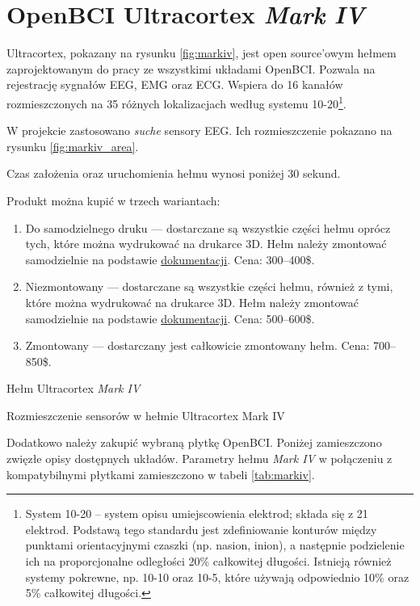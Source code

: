 \documentclass[skorowidz,skroty]{dyplomWEZUT}
\begin{document}
\section{OpenBCI Ultracortex \textit{Mark IV}\label{sec:markiv}}
Ultracortex, pokazany na rysunku \vref{fig:markiv}, jest open source'owym hełmem zaprojektowanym do pracy ze wszystkimi układami OpenBCI\cite{markiv_shop}. Pozwala na rejestrację sygnałów EEG, EMG oraz ECG. Wspiera do 16 kanałów rozmieszczonych na 35 różnych lokalizacjach według systemu 10-20\footnote{System 10-20 -- system opisu umiejscowienia elektrod; składa się z 21 elektrod. Podstawą tego standardu jest zdefiniowanie konturów między punktami orientacyjnymi czaszki (np. nasion, inion), a następnie podzielenie ich na proporcjonalne odległości 20\% całkowitej długości. Istnieją również systemy pokrewne, np. 10-10 oraz 10-5, które używają odpowiednio 10\% oraz 5\% całkowitej długości\cite[rozdz. 6]{bci_principles}.}.

W projekcie zastosowano \textit{suche} sensory EEG. Ich rozmieszczenie pokazano na rysunku \vref{fig:markiv_area}.

Czas założenia oraz uruchomienia hełmu wynosi poniżej 30 sekund.

Produkt można kupić w trzech wariantach:
\begin{enumerate}
    \item Do samodzielnego druku --- dostarczane są wszystkie części hełmu oprócz tych, które można wydrukować na drukarce 3D. Hełm należy zmontować samodzielnie na podstawie \href{https://docs.openbci.com/Headware/01-Ultracortex-Mark-IV#ultracortex-mark-iv-assembly-instructions}{dokumentacji}. Cena: 300--400\$.
    \item Niezmontowany --- dostarczane są wszystkie części hełmu, również z tymi, które można wydrukować na drukarce 3D. Hełm należy zmontować samodzielnie na podstawie \href{https://docs.openbci.com/Headware/01-Ultracortex-Mark-IV#ultracortex-mark-iv-assembly-instructions}{dokumentacji}. Cena: 500--600\$.
    \item Zmontowany --- dostarczany jest całkowicie zmontowany hełm. Cena: 700--850\$.
\end{enumerate}

{Hełm Ultracortex \textit{Mark IV}\label{fig:markiv}}
{\cite{markiv}}

{Rozmieszczenie sensorów w hełmie Ultracortex Mark IV\label{fig:markiv_area}}
{\cite{markiv_shop}}

Dodatkowo należy zakupić wybraną płytkę OpenBCI. Poniżej zamieszczono zwięzłe opisy dostępnych układów. Parametry hełmu \textit{Mark IV} w połączeniu z kompatybilnymi płytkami zamieszczono w tabeli \vref{tab:markiv}.
\end{document}

